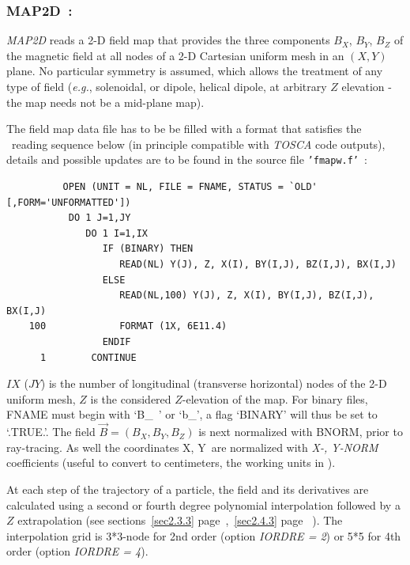 \newpage

\subsubsection*{MAP2D~: \MAPTwoDTitl~\cite{Pavel}} \label{MAP2D} 
\medskip

\textsl{MAP2D} reads a 2-D field map that provides the three
components $ B_X$, $ B_Y $, $ B_Z $ of the magnetic field at all nodes of a 2-D Cartesian 
uniform mesh in an $(X,Y)$ plane. 
No particular symmetry is assumed, which allows the 
treatment of any type of field (\emph{e.g.}, solenoidal, or dipole,  
helical dipole, at  arbitrary $Z$ elevation 
- the map needs not be a mid-plane map). 

\medskip

\noindent The field map data file has to be be filled with a 
format that satisfies the  \FORTRAN\ reading sequence below (in principle compatible 
with \textsl{TOSCA} code outputs), details and possible updates are to be found in the source  
file \texttt{'fmapw.f'}~:  

{\footnotesize
\begin{verbatim}
	      OPEN (UNIT = NL, FILE = FNAME, STATUS = `OLD' [,FORM='UNFORMATTED'])
	       DO 1 J=1,JY 
	          DO 1 I=1,IX
	             IF (BINARY) THEN
	                READ(NL) Y(J), Z, X(I), BY(I,J), BZ(I,J), BX(I,J)
	             ELSE
	                READ(NL,100) Y(J), Z, X(I), BY(I,J), BZ(I,J), BX(I,J)
	100             FORMAT (1X, 6E11.4)
	             ENDIF
      1        CONTINUE
\end{verbatim}}
\medskip

\noindent $IX$ ($JY$) is the number of longitudinal (transverse horizontal) nodes of 
the 2-D uniform mesh, $Z $ is the considered $Z$-elevation of the map. For 
binary files, FNAME must begin with \mbox{`B\_ '} or  \mbox{`b\_'}, a flag `BINARY' will thus be 
set to `.TRUE.'. The field $ \vec  B=(B_X,B_Y,B_Z )$ is next normalized with 
BNORM, prior to ray-tracing.  As well the  coordinates  X, Y~are normalized with 
  \textsl{X-, Y-NORM} coefficients (useful to convert to centimeters, the working units in  \zgoubi). 


\medskip

\noindent At each step of the trajectory of a particle, the field and its 
derivatives are calculated using a second or fourth degree polynomial interpolation followed 
by a $ Z $ extrapolation (see sections~\ref{sec2.3.3} page~\pageref{sec2.3.3},~\ref{sec2.4.3} page ~\pageref{sec2.4.3}). 
The  interpolation grid is 3*3-node for 2nd order (option \textsl{IORDRE = 2}) or 5*5 
for 4th order (option \textsl{IORDRE = 4}). 

